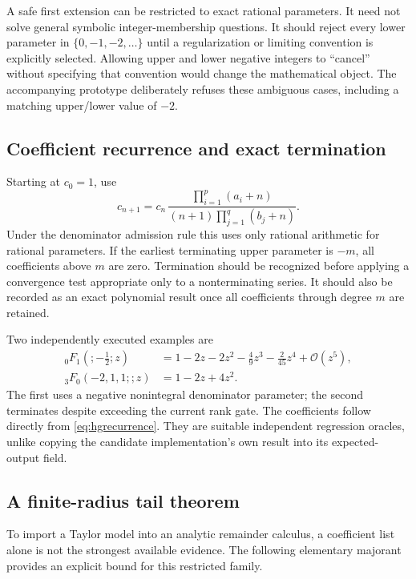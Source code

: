 \documentclass[11pt,letterpaper]{article}
\newcommand{\OO}{\mathcal{O}}
\begin{document}
A safe first extension can be restricted to exact rational parameters. It need not solve general symbolic integer-membership questions. It should reject every lower parameter in $\{0,-1,-2,\ldots\}$ until a regularization or limiting convention is explicitly selected. Allowing upper and lower negative integers to ``cancel'' without specifying that convention would change the mathematical object. The accompanying prototype deliberately refuses these ambiguous cases, including a matching upper/lower value of $-2$.

\subsection{Coefficient recurrence and exact termination}

Starting at $c_0=1$, use
\begin{equation}\label{eq:hgrecurrence}
 c_{n+1}=c_n\,
   \frac{\prod_{i=1}^p(a_i+n)}{(n+1)\prod_{j=1}^q(b_j+n)}.
\end{equation}
Under the denominator admission rule this uses only rational arithmetic for rational parameters. If the earliest terminating upper parameter is $-m$, all coefficients above $m$ are zero. Termination should be recognized before applying a convergence test appropriate only to a nonterminating series. It should also be recorded as an exact polynomial result once all coefficients through degree $m$ are retained.

Two independently executed examples are
\begin{align}
 {}_0F_1\!\left(; -\tfrac12;z\right)
   &=1-2z-2z^2-\tfrac49z^3-\tfrac{2}{45}z^4+\OO(z^5),\label{eq:0f1}\\
 {}_3F_0(-2,1,1;;z)&=1-2z+4z^2.\label{eq:3f0}
\end{align}
The first uses a negative nonintegral denominator parameter; the second terminates despite exceeding the current rank gate. The coefficients follow directly from \eqref{eq:hgrecurrence}. They are suitable independent regression oracles, unlike copying the candidate implementation's own result into its expected-output field.

\subsection{A finite-radius tail theorem}

To import a Taylor model into an analytic remainder calculus, a coefficient list alone is not the strongest available evidence. The following elementary majorant provides an explicit bound for this restricted family.
\end{document}
